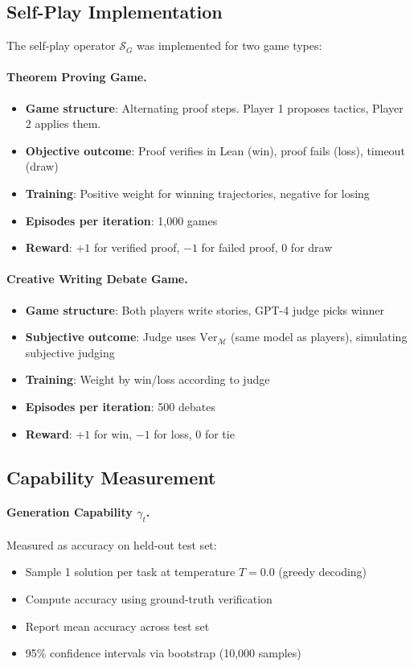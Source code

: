 \documentclass{article}
\theoremstyle{definition}
\theoremstyle{remark}
\newcommand{\M}{\mathcal{M}}
\newcommand{\Ver}{\text{Ver}}
\begin{document}
\subsection{Self-Play Implementation}

The self-play operator \(\mathcal{S}_G\) was implemented for two game types:

\paragraph{Theorem Proving Game.}
\begin{itemize}
\item \textbf{Game structure}: Alternating proof steps. Player 1 proposes tactics, Player 2 applies them.
\item \textbf{Objective outcome}: Proof verifies in Lean (win), proof fails (loss), timeout (draw)
\item \textbf{Training}: Positive weight for winning trajectories, negative for losing
\item \textbf{Episodes per iteration}: 1,000 games
\item \textbf{Reward}: \(+1\) for verified proof, \(-1\) for failed proof, \(0\) for draw
\end{itemize}

\paragraph{Creative Writing Debate Game.}
\begin{itemize}
\item \textbf{Game structure}: Both players write stories, GPT-4 judge picks winner
\item \textbf{Subjective outcome}: Judge uses \(\Ver_{\M}\) (same model as players), simulating subjective judging
\item \textbf{Training}: Weight by win/loss according to judge
\item \textbf{Episodes per iteration}: 500 debates
\item \textbf{Reward}: \(+1\) for win, \(-1\) for loss, \(0\) for tie
\end{itemize}

\subsection{Capability Measurement}

\paragraph{Generation Capability \(\gamma_t\).}
Measured as accuracy on held-out test set:
\begin{itemize}
\item Sample 1 solution per task at temperature \(T = 0.0\) (greedy decoding)
\item Compute accuracy using ground-truth verification
\item Report mean accuracy across test set
\item 95\% confidence intervals via bootstrap (10,000 samples)
\end{itemize}
\end{document}
